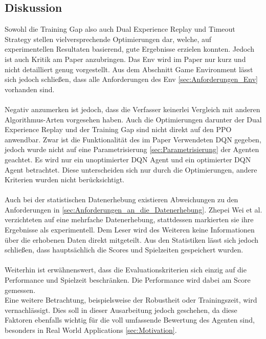 \subsection{Diskussion} \label{sec:Paper_1_Diskussion}
Sowohl die Training Gap also auch Dual Experience Replay und Timeout Strategy stellen vielversprechende Optimierungen dar, welche, auf experimentellen Resultaten basierend, gute Ergebnisse erzielen konnten. Jedoch ist auch Kritik am Paper anzubringen.
Das Env wird im Paper nur kurz und nicht detailliert genug vorgestellt. Aus dem Abschnitt Game Environment lässt sich jedoch schließen, dass alle Anforderungen des Env \ref{sec:Anforderungen_Env} vorhanden sind.\\
\\ Negativ anzumerken ist jedoch, dass die Verfasser keinerlei Vergleich mit anderen Algorithmus-Arten vorgesehen haben. Auch die Optimierungen darunter der Dual Experience Replay und der Training Gap sind nicht direkt auf den PPO anwendbar. Zwar ist die Funktionalität des im Paper Verwendeten DQN gegeben, jedoch wurde nicht auf eine Parametrisierung \ref{sec:Parametrisierung} der Agenten geachtet. Es wird nur ein unoptimierter DQN Agent und ein optimierter DQN Agent betrachtet. Diese unterscheiden sich nur durch die Optimierungen, andere Kriterien wurden nicht berücksichtigt.\\
\\Auch bei der statistischen Datenerhebung existieren Abweichungen zu den Anforderungen in \ref{sec:Anforderungen_an_die_Datenerhebung}. Zhepei Wei et al. verzichteten auf eine mehrfache Datenerhebung, stattdessen markierten sie ihre Ergebnisse als experimentell. Dem Leser wird des Weiteren keine Informationen über die erhobenen Daten direkt mitgeteilt. Aus den Statistiken lässt sich jedoch schließen, dass hauptsächlich die Scores und Spielzeiten gespeichert wurden.\\
\\ Weiterhin ist erwähnenswert, dass die Evaluationskriterien sich einzig auf die Performance und Spielzeit beschränken. Die Performance wird dabei am Score gemessen.\\
Eine weitere Betrachtung, beispielsweise der Robustheit oder Trainingszeit, wird vernachlässigt. Dies soll in dieser Ausarbeitung jedoch geschehen, da diese Faktoren ebenfalls wichtig für die voll umfassende Bewertung des Agenten sind, besonders in Real World Applications \ref{sec:Motivation}.


